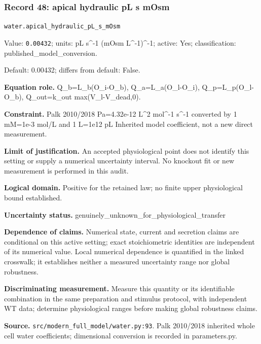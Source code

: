 \subsubsection*{Record 48: apical hydraulic pL s mOsm}
{\small \nolinkurl{water.apical_hydraulic_pL_s_mOsm}\par

Value: \texttt{0.00432}; units: pL s\textasciicircum{}-1 (mOsm L\textasciicircum{}-1)\textasciicircum{}-1; active: Yes; classification: published\_model\_conversion.\par

Default: 0.00432; differs from default: False.\par

\textbf{Equation role.} Q\_b=L\_b(O\_i-O\_b), Q\_a=L\_a(O\_l-O\_i), Q\_p=L\_p(O\_l-O\_b), Q\_out=k\_out max(V\_l-V\_dead,0).\par

\textbf{Constraint.} Palk 2010/2018 Pa=4.32e-12 L\textasciicircum{}2 mol\textasciicircum{}-1 s\textasciicircum{}-1 converted by 1 mM=1e-3 mol/L and 1 L=1e12 pL Inherited model coefficient, not a new direct measurement.\par

\textbf{Limit of justification.} An accepted physiological point does not identify this setting or supply a numerical uncertainty interval. No knockout fit or new measurement is performed in this audit.\par

\textbf{Logical domain.} Positive for the retained law; no finite upper physiological bound established.\par

\textbf{Uncertainty status.} genuinely\_unknown\_for\_physiological\_transfer\par

\textbf{Dependence of claims.} Numerical state, current and secretion claims are conditional on this active setting; exact stoichiometric identities are independent of its numerical value. Local numerical dependence is quantified in the linked crosswalk; it establishes neither a measured uncertainty range nor global robustness.\par

\textbf{Discriminating measurement.} Measure this quantity or its identifiable combination in the same preparation and stimulus protocol, with independent WT data; determine physiological ranges before making global robustness claims.\par

\textbf{Source.} \nolinkurl{src/modern_full_model/water.py:93}. Palk 2010/2018 inherited whole cell water coefficients; dimensional conversion is recorded in parameters.py.\par}

